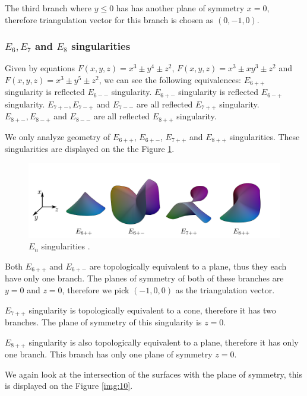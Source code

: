 The third branch where $y\leq0$ has has another plane of symmetry $x=0$,
therefore triangulation vector for this branch is chosen as $(0, -1, 0)$.

\subsubsection*{$E_6, E_7$ and $E_8$ singularities}

Given by equations $F(x,y,z)=x^3\pm y^4\pm z^2$, $F(x,y,z)=x^3\pm xy^3\pm z^2$
and $F(x,y,z)=x^3\pm y^5\pm z^2$, we can see the following equivalences:
$E_{6++}$ singularity is reflected $E_{6--}$ singularity.
$E_{6+-}$ singularity is reflected $E_{6-+}$ singularity.
$E_{7+-}, E_{7-+}$ and $E_{7--}$ are all reflected $E_{7++}$ singularity.
$E_{8+-}, E_{8-+}$ and $E_{8--}$ are all reflected $E_{8++}$ singularity.

We only analyze geometry of $E_{6++}$, $E_{6+-}$, $E_{7++}$ and $E_{8++}$
singularities. These singularities are displayed on the the Figure \ref{img:12}.


\begin{figure}
    \centerline{\includegraphics[scale=0.5]{images/img12}}
    \caption[$E_n$ singularities.]
    {$E_n$ singularities \cite{morris2003client}.}
    \label{img:12}
\end{figure}
Both $E_{6++}$ and $E_{6+-}$ are topologically equivalent to a plane, thus
they each have only one branch. The planes of symmetry of both of these 
branches are $y=0$ and $z=0$, therefore we pick $(-1, 0, 0)$ as the
triangulation vector.

$E_{7++}$ singularity is topologically equivalent to a cone, therefore it has
two branches. The plane of symmetry of this singularity is $z=0$.

$E_{8++}$ singularity is also topologically equivalent to a plane, therefore
it has only one branch. This branch has only one plane of symmetry $z=0$.

We again look at the intersection of the surfaces with the plane of 
symmetry, this is displayed on the Figure \ref{img:10}.

